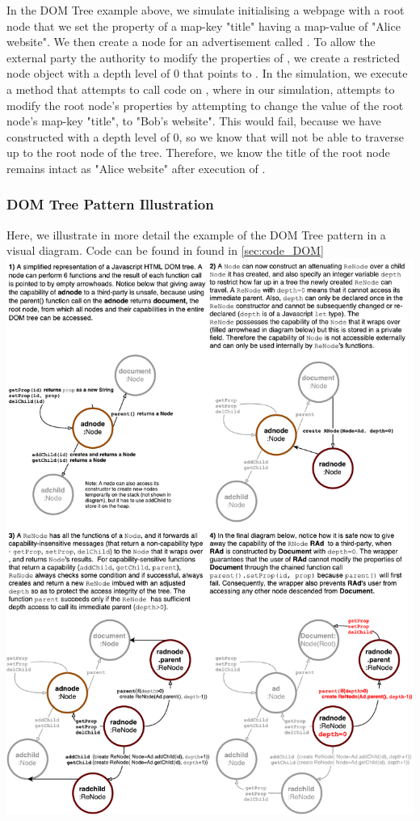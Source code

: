\documentclass[a4paper,11pt,twoside]{article}
\begin{document}
In the DOM Tree example above, we simulate initialising a webpage with a root  node that we set the property of a map-key "title" having a map-value of "Alice website". We then create a node for an advertisement called . To allow the external party the authority to modify the properties of , we create a restricted node object  with a depth level of 0 that points to . In the simulation, we execute a method  that attempts to call code on , where in our simulation,  attempts to modify the root  node's properties by attempting to change the value of the root node's map-key "title", to "Bob's website". This would fail, because we have constructed  with a depth level of 0, so we know that  will not be able to traverse up to the root node of the tree. Therefore, we know the title of the root node remains intact as "Alice website" after execution of .
\begin{minipage}{\textwidth}
\subsubsection{DOM Tree Pattern Illustration}\label{sec:figdom}
\raggedright \small Here, we illustrate in more detail the example of the DOM Tree pattern in a visual diagram. Code can be found in found in \cref{sec:code_DOM}\\
\centering
\includegraphics[width=1.05\textwidth]{figures/DOM.pdf}
 \label{fig:figdom}
\end{minipage}
\clearpage
\end{document}
